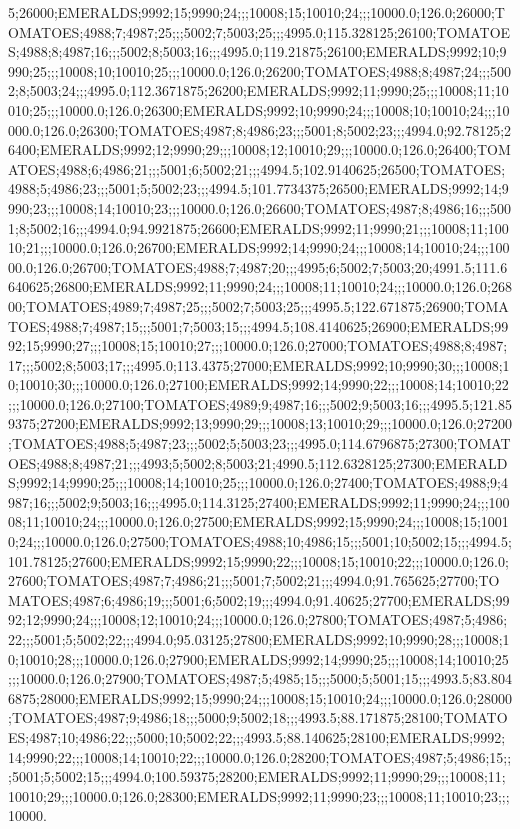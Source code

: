 5;26000;EMERALDS;9992;15;9990;24;;;10008;15;10010;24;;;10000.0;126.0;26000;TOMATOES;4988;7;4987;25;;;5002;7;5003;25;;;4995.0;115.328125;26100;TOMATOES;4988;8;4987;16;;;5002;8;5003;16;;;4995.0;119.21875;26100;EMERALDS;9992;10;9990;25;;;10008;10;10010;25;;;10000.0;126.0;26200;TOMATOES;4988;8;4987;24;;;5002;8;5003;24;;;4995.0;112.3671875;26200;EMERALDS;9992;11;9990;25;;;10008;11;10010;25;;;10000.0;126.0;26300;EMERALDS;9992;10;9990;24;;;10008;10;10010;24;;;10000.0;126.0;26300;TOMATOES;4987;8;4986;23;;;5001;8;5002;23;;;4994.0;92.78125;26400;EMERALDS;9992;12;9990;29;;;10008;12;10010;29;;;10000.0;126.0;26400;TOMATOES;4988;6;4986;21;;;5001;6;5002;21;;;4994.5;102.9140625;26500;TOMATOES;4988;5;4986;23;;;5001;5;5002;23;;;4994.5;101.7734375;26500;EMERALDS;9992;14;9990;23;;;10008;14;10010;23;;;10000.0;126.0;26600;TOMATOES;4987;8;4986;16;;;5001;8;5002;16;;;4994.0;94.9921875;26600;EMERALDS;9992;11;9990;21;;;10008;11;10010;21;;;10000.0;126.0;26700;EMERALDS;9992;14;9990;24;;;10008;14;10010;24;;;10000.0;126.0;26700;TOMATOES;4988;7;4987;20;;;4995;6;5002;7;5003;20;4991.5;111.6640625;26800;EMERALDS;9992;11;9990;24;;;10008;11;10010;24;;;10000.0;126.0;26800;TOMATOES;4989;7;4987;25;;;5002;7;5003;25;;;4995.5;122.671875;26900;TOMATOES;4988;7;4987;15;;;5001;7;5003;15;;;4994.5;108.4140625;26900;EMERALDS;9992;15;9990;27;;;10008;15;10010;27;;;10000.0;126.0;27000;TOMATOES;4988;8;4987;17;;;5002;8;5003;17;;;4995.0;113.4375;27000;EMERALDS;9992;10;9990;30;;;10008;10;10010;30;;;10000.0;126.0;27100;EMERALDS;9992;14;9990;22;;;10008;14;10010;22;;;10000.0;126.0;27100;TOMATOES;4989;9;4987;16;;;5002;9;5003;16;;;4995.5;121.859375;27200;EMERALDS;9992;13;9990;29;;;10008;13;10010;29;;;10000.0;126.0;27200;TOMATOES;4988;5;4987;23;;;5002;5;5003;23;;;4995.0;114.6796875;27300;TOMATOES;4988;8;4987;21;;;4993;5;5002;8;5003;21;4990.5;112.6328125;27300;EMERALDS;9992;14;9990;25;;;10008;14;10010;25;;;10000.0;126.0;27400;TOMATOES;4988;9;4987;16;;;5002;9;5003;16;;;4995.0;114.3125;27400;EMERALDS;9992;11;9990;24;;;10008;11;10010;24;;;10000.0;126.0;27500;EMERALDS;9992;15;9990;24;;;10008;15;10010;24;;;10000.0;126.0;27500;TOMATOES;4988;10;4986;15;;;5001;10;5002;15;;;4994.5;101.78125;27600;EMERALDS;9992;15;9990;22;;;10008;15;10010;22;;;10000.0;126.0;27600;TOMATOES;4987;7;4986;21;;;5001;7;5002;21;;;4994.0;91.765625;27700;TOMATOES;4987;6;4986;19;;;5001;6;5002;19;;;4994.0;91.40625;27700;EMERALDS;9992;12;9990;24;;;10008;12;10010;24;;;10000.0;126.0;27800;TOMATOES;4987;5;4986;22;;;5001;5;5002;22;;;4994.0;95.03125;27800;EMERALDS;9992;10;9990;28;;;10008;10;10010;28;;;10000.0;126.0;27900;EMERALDS;9992;14;9990;25;;;10008;14;10010;25;;;10000.0;126.0;27900;TOMATOES;4987;5;4985;15;;;5000;5;5001;15;;;4993.5;83.8046875;28000;EMERALDS;9992;15;9990;24;;;10008;15;10010;24;;;10000.0;126.0;28000;TOMATOES;4987;9;4986;18;;;5000;9;5002;18;;;4993.5;88.171875;28100;TOMATOES;4987;10;4986;22;;;5000;10;5002;22;;;4993.5;88.140625;28100;EMERALDS;9992;14;9990;22;;;10008;14;10010;22;;;10000.0;126.0;28200;TOMATOES;4987;5;4986;15;;;5001;5;5002;15;;;4994.0;100.59375;28200;EMERALDS;9992;11;9990;29;;;10008;11;10010;29;;;10000.0;126.0;28300;EMERALDS;9992;11;9990;23;;;10008;11;10010;23;;;10000.